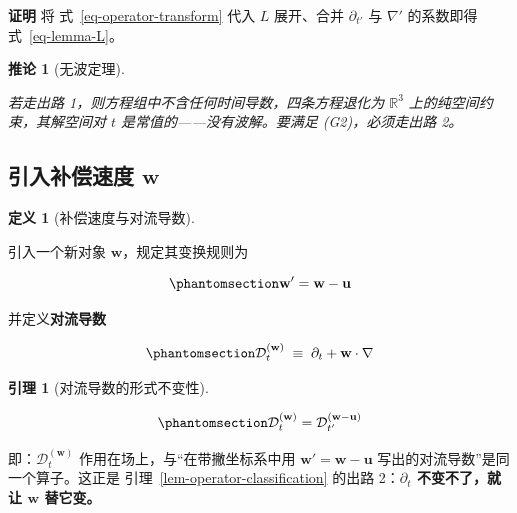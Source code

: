 \documentclass[
  chinese,
  a4paper,
  UTF8,
  12pt,
  oneside,
  openany]{ctexbook}
\theoremstyle{plain}
\theoremstyle{plain}
\theoremstyle{plain}
\theoremstyle{definition}
\newtheorem{definition}{定义}[chapter]
\theoremstyle{plain}
\newtheorem{corollary}{推论}[chapter]
\theoremstyle{plain}
\newtheorem{lemma}{引理}[chapter]
\theoremstyle{remark}
\begin{document}
\textbf{证明} 将 式~\ref{eq-operator-transform} 代入 \(L\) 展开、合并
\(\partial_{t'}\) 与 \(\nabla'\) 的系数即得 式~\ref{eq-lemma-L}。

\begin{corollary}[无波定理]\protect\hypertarget{cor-no-wave}{}\label{cor-no-wave}

若走出路 1，则方程组中不含任何时间导数，四条方程退化为
\(\mathbb{R}^{3}\) 上的纯空间约束，其解空间对 \(t\)
是常值的------没有波解。要满足 (G2)，必须走出路 2。

\end{corollary}

\subsection{\texorpdfstring{引入补偿速度
\(\mathbf{w}\)}{引入补偿速度 \textbackslash mathbf\{w\}}}\label{ux5f15ux5165ux8865ux507fux901fux5ea6-mathbfw}

\begin{definition}[补偿速度与对流导数]\protect\hypertarget{def-convective}{}\label{def-convective}

引入一个新对象 \(\mathbf{w}\)，规定其变换规则为

\begin{equation}\protect\phantomsection\label{eq-w-transform}{
\mathbf{w}' = \mathbf{w} - \mathbf{u}
}\end{equation}

并定义\textbf{对流导数}

\begin{equation}\protect\phantomsection\label{eq-convective-def}{
\mathcal{D}_{t}^{(\mathbf{w})} \;\equiv\; \partial_{t} + \mathbf{w}\cdot\nabla
}\end{equation}

\end{definition}

\begin{lemma}[对流导数的形式不变性]\protect\hypertarget{lem-convective-invariance}{}\label{lem-convective-invariance}

\begin{equation}\protect\phantomsection\label{eq-convective-proof}{
\mathcal{D}_{t}^{(\mathbf{w})} = \mathcal{D}_{t'}^{(\mathbf{w}-\mathbf{u})}
}\end{equation}

\end{lemma}

即：\(\mathcal{D}_t^{(\mathbf{w})}\) 作用在场上，与``在带撇坐标系中用
\(\mathbf{w}'=\mathbf{w}-\mathbf{u}\)
写出的对流导数''是同一个算子。这正是
引理~\ref{lem-operator-classification} 的出路 2：\textbf{\(\partial_t\)
不变不了，就让 \(\mathbf{w}\) 替它变。}
\end{document}

